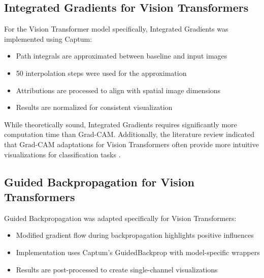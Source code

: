 \documentclass[a4paper,12pt]{report}
\begin{document}

\subsection{Integrated Gradients for Vision Transformers}

For the Vision Transformer model specifically, Integrated Gradients was implemented using Captum:

\begin{itemize}
    \item Path integrals are approximated between baseline and input images
    \item 50 interpolation steps were used for the approximation
    \item Attributions are processed to align with spatial image dimensions
    \item Results are normalized for consistent visualization
\end{itemize}

While theoretically sound, Integrated Gradients requires significantly more computation time than Grad-CAM. Additionally, the literature review indicated that Grad-CAM adaptations for Vision Transformers often provide more intuitive visualizations for classification tasks \cite{chefer2021transformer}.

\subsection{Guided Backpropagation for Vision Transformers}

Guided Backpropagation was adapted specifically for Vision Transformers:

\begin{itemize}
    \item Modified gradient flow during backpropagation highlights positive influences
    \item Implementation uses Captum's GuidedBackprop with model-specific wrappers
    \item Results are post-processed to create single-channel visualizations
\end{itemize}
\end{document}
